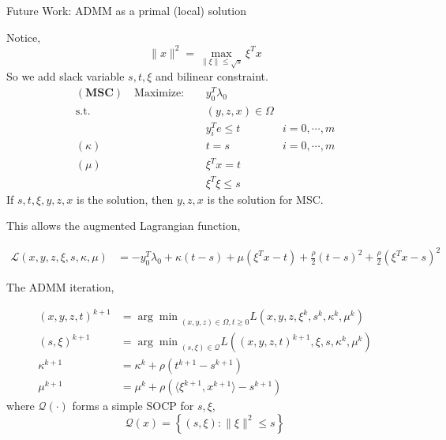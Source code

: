 \documentclass[aspectratio=1610, 10pt]{beamer}
\newcommand{\model}[1]{(\textbf{#1})}
\begin{document}
\begin{frame}[allowframebreaks]{Future Work: ADMM as a primal (local) solution}

  Notice,
  \begin{equation}
    \|x\|^2 = \max_{\|\xi\| \le \sqrt s} \xi^T x
  \end{equation}
  So we add slack variable \(s, t, \xi\) and bilinear constraint.
  \begin{align}
    \model{MSC} \quad \mathrm{Maximize: }\quad & y_0 ^T\lambda_0                     \\
    \mathrm{s.t.} \quad                        & (y,z,x) \in \Omega                  \\
                                               & y_i^Te \le t       & i=0, \cdots, m \\
    (\kappa) \quad                             & t= s               & i=0, \cdots, m \\
    (\mu)    \quad                             & \xi^Tx = t                          \\
                                               & \xi^T\xi \le s
  \end{align}
  If \(s, t, \xi, y, z, x\) is the solution, then \( y, z, x\) is the solution for MSC.

  This allows the augmented Lagrangian function,

  \begin{align*}
    \mathscr L\left(x,y,z,\xi,s,\kappa,\mu\right) & = - y_0 ^T\lambda_0 + \kappa(t-s) + \mu(\xi^Tx - t) + \frac{\rho}{2}(t-s)^2 + \frac{\rho}{2}(\xi^Tx - s)^2
  \end{align*}

  The ADMM iteration,

  \begin{align*}
    (x,y,z,t)^{k+1} & = {\arg\min}_{(x,y,z)\in\Omega, t\ge 0} L\left(x,y,z,\xi^k,s^k,\kappa^k,\mu^k\right)       \\
    (s, \xi)^{k+1}  & = {\arg\min}_{(s, \xi)\in\mathscr{Q}} L\left((x,y,z,t)^{k+1},\xi,s, \kappa^k, \mu^k\right) \\
    \kappa^{k+1}    & = \kappa^k + \rho\left(t^{k+1}-s^{k+1}\right)                                              \\
    \mu^{k+1}       & = \mu^k + \rho\left( \langle\xi^{k+1}, x^{k+1}\rangle - s^{k+1}\right)
  \end{align*}
  where \(\mathscr{Q(\cdot)}\) forms a simple SOCP for \(s, \xi\),
  \begin{equation}
    \mathscr{Q}(x) =\left\{(s,\xi): \|\xi\|^2 \le s\right\}
  \end{equation}


\end{frame}
\end{document}

